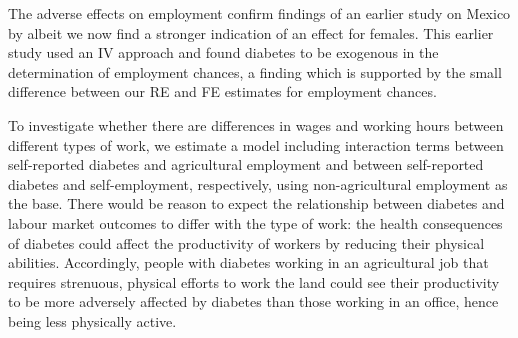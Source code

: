 \documentclass[12pt,english,british]{article}
\begin{document}
The adverse effects on employment confirm findings of an earlier study on Mexico by \cite{Seuring2015} albeit we now find a stronger indication of an effect for females. This earlier study used an \ac{IV} approach and found diabetes to be exogenous in the determination of employment chances, a finding which is supported by the small difference between our \ac{RE} and \ac{FE} estimates for employment chances.

To investigate whether there are differences in
wages and working hours between different types of work, we estimate
a model including interaction terms between self-reported diabetes
and agricultural employment and between self-reported diabetes and
self-employment, respectively, using non-agricultural employment as
the base. There would be reason to expect the relationship between
diabetes and labour market outcomes to differ with the type of work:
the health consequences of diabetes could affect the productivity
of workers by reducing their physical abilities. Accordingly, people
with diabetes working in an agricultural job that requires strenuous,
physical efforts to work the land could see their productivity to be
more adversely affected by diabetes than those working in an office,
hence being less physically active. 
\end{document}
